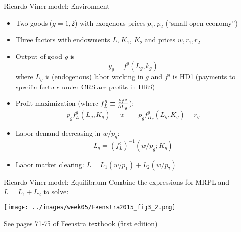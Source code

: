 \documentclass[11pt,notes=hide,aspectratio=169]{beamer}
\begin{document}
\begin{frame}{Ricardo-Viner model: Environment}
\begin{itemize}
	\item Two goods ($g=1,2$) with exogenous prices $p_1,p_2$ (``small open economy'')
	\item Three factors with endowments $L$, $K_1$, $K_2$ and prices $w,r_1,r_2$
	\item Output of good $g$ is
	\begin{equation*}
		y_g = f^g \left(L_g,k_g\right)
	\end{equation*}
	where $L_g$ is (endogenous) labor working in $g$ and $f^g$ is HD1
	(payments to specific factors under CRS are profits in DRS)
	\item Profit maximization (where $f^g_{L} \equiv \pdv{f^g}{L_g}$):
	\begin{equation*}
		p_g f^g_{L} \left(L_g,K_g\right) = w 
		\qquad
		p_g f^g_{K_g}\left(L_g,K_g\right) = r_g 
	\end{equation*}
	\item Labor demand decreasing in $w/p_g$: 
	$$L_g = (f^g_{L})^{-1}(w/p_g;K_g)$$
	\item Labor market clearing: $L = L_1(w/p_1) + L_2(w/p_2)$
\end{itemize}
\end{frame}
\begin{frame}{Ricardo-Viner model: Equilibrium}
Combine the expressions for MRPL and $L = L_1 + L_2$ to solve:
\begin{center}\texttt{[image: ../images/week05/Feenstra2015\_fig3\_2.png]}\end{center}
{\footnotesize See pages 71-75 of Feenstra textbook (first edition)}
\end{frame}
\end{document}

